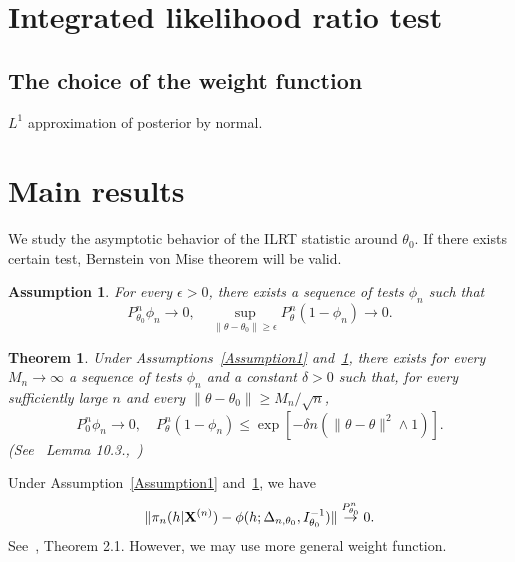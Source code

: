 \documentclass[3p]{elsarticle}
\theoremstyle{plain}
\newtheorem{theorem}{\quad\quad Theorem}
\newtheorem{assumption}{\quad\quad Assumption}
\theoremstyle{definition}
\theoremstyle{remark}
\begin{document}
\section{Integrated likelihood ratio test}

\subsection{The choice of the weight function}
$L^1$ approximation of posterior by normal.


\section{Main results}


We study the asymptotic behavior of the ILRT statistic around $\theta_0$.
If there exists certain test, Bernstein von Mise theorem will be valid.
\begin{assumption}\label{Assumption2}
    For every $\epsilon>0$, there exists a sequence of tests $\phi_n$ such that
        \begin{equation}
            P_{\theta_0}^n\phi_n\to 0,\quad \sup_{\|\theta-\theta_0\|\geq \epsilon} P_\theta^n(1-\phi_n)\to 0.
        \end{equation}
\end{assumption}
\begin{theorem}\label{Thm:someTest}
    Under Assumptions~\ref{Assumption1} and~\ref{Assumption2},
    there exists for every $M_n\to \infty$ a sequence of tests $\phi_n$ and a constant $\delta>0$ such that, for every sufficiently large $n$ and every $\|\theta-\theta_0\|\geq M_n/\sqrt{n}$,
    $$
    P^n_{0} \phi_n\to 0,\quad
    P^n_{\theta} (1-\phi_n)\leq \exp[-\delta n(\|\theta-\theta\|^2\wedge 1)].
    $$
    (See~\cite{van2000asymptotic} Lemma 10.3.,~\cite{Kleijn2012The})
\end{theorem}
Under Assumption~\ref{Assumption1} and~\ref{Assumption2}, we have 
$$
            \|\pi_n(h|\mathbf{X}^{(n)})-\phi(h;\Delta_{n,\theta_0},I_{\theta_0}^{-1})\|\overset{P_{\theta_0}^n}{\to}0.
$$
See~\cite{Kleijn2012The}, Theorem 2.1.
However, we may use more general weight function.
        
\end{document}
